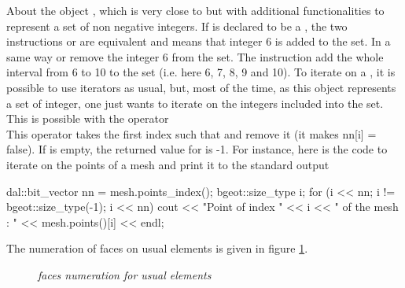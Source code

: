 \documentclass[11pt,a4paper]{article}
\begin{document}
About the object , which is very close to  but with additional functionalities to represent a set of non negative integers. If  is declared to be a , the two instructions  or  are equivalent and means that integer 6 is added to the set. In a same way  or  remove the integer 6 from the set. The instruction  add the whole interval from 6 to 10 to the set (i.e. here 6, 7, 8, 9 and 10). To iterate on a , it is possible to use iterators as usual,  but, most of the time, as this object represents a set of integer, one just wants to iterate on the integers included into the set. This is possible with the operator
\\[0.5cm]
This operator takes the first index such that  and remove it (it makes nn[i] = false). If  is empty, the returned value for  is -1. For instance, here is the code to iterate on the points of a mesh and print it to the standard output
\begin{cppcode}
  dal::bit\_vector nn = mesh.points\_index();
  bgeot::size\_type i;
  for (i << nn; i != bgeot::size\_type(-1); i << nn)
    cout << "Point of index " << i << " of the mesh : " << mesh.points()[i] << endl;
\end{cppcode}
The numeration of faces on usual elements is given in figure \ref{fig:elemf}.
\begin{figure}[htb]
  \begin{center}
  \end{center}
  \caption{ \it faces numeration for usual elements }
  \label{fig:elemf}
\end{figure}
\end{document}
